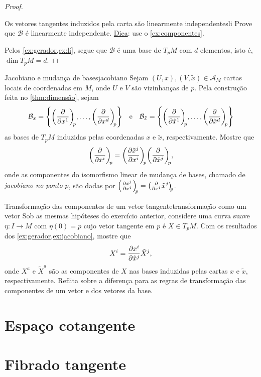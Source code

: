 \documentclass[12pt,a4paper]{article}
\numberwithin{equation}{section}
\DeclarePairedDelimiter\set{\{}{\}}
\newcommand\bvec[3][]{\ensuremath{\diffp*{#1}{#2}[#3]}}
\newcommand\bset[3]{\ensuremath{\set*{\diffp*{}{{#1}^1}[#3], \dots, \diffp*{}{{#1}^{#2}}[#3]}}}
\begin{document}
\begin{proof}
    \begin{exercício}{Os vetores tangentes induzidos pela carta são linearmente independentes}{li}
        Prove que \(\mathcal{B}\) é linearmente independente. \underline{Dica}: use o \cref{ex:componentes}.
    \end{exercício}

    Pelos \cref{ex:gerador,ex:li}, segue que \(\mathcal{B}\) é uma base de \(T_pM\) com \(d\) elementos, isto é, \(\dim{T_pM} = d\).
\end{proof}

\begin{exercício}{Jacobiano e mudança de bases}{jacobiano}
    Sejam \((U, x), (V, \tilde{x}) \in \mathscr{A}_M\) cartas locais de coordenadas em \(M\), onde \(U\) e \(V\) são vizinhanças de \(p\). Pela construção feita no \cref{thm:dimensão}, sejam
    \begin{equation*}
        \mathcal{B}_x=\bset{x}{d}{p}\quad\text{e}\quad\mathcal{B}_{\tilde{x}}=\bset{\tilde{x}}{d}{p}
    \end{equation*}
    as bases de \(T_pM\) induzidas pelas coordenadas \(x\) e \(\tilde{x}\), respectivamente. Mostre que
    \begin{equation*}
        \bvec{x^i}{p} = \diffp{\tilde{x}^j}{x^i}[p]\bvec{\tilde{x}^j}{p},
    \end{equation*}
    onde as componentes do isomorfismo linear de mudança de bases, chamado de \emph{jacobiano no ponto \(p\)}, são dadas por \(\diffp{\tilde{x}^j}{x^i}[p] = \bvec[\tilde{x}^j]{x^i}{p}\).
\end{exercício}

\begin{exercício}{Transformação das componentes de um vetor tangente}{transformação como um vetor}
    Sob as mesmas hipóteses do exercício anterior, considere uma curva suave \(\eta : I \to M\) com \(\eta(0) = p\) cujo vetor tangente em \(p\) é \(X \in T_pM\). Com os resultados dos \cref{ex:gerador,ex:jacobiano}, mostre que
    \begin{equation*}
        X^i = \diffp{x^i}{\tilde{x}^j} \tilde{X}^j,
    \end{equation*}
    onde \(X^a\) e \(\tilde{X}^a\) são as componentes de \(X\) nas bases induzidas pelas cartas \(x\) e \(\tilde{x}\), respectivamente. Reflita sobre a diferença para as regras de transformação das componentes de um vetor e dos vetores da base.
\end{exercício}

\section{Espaço cotangente}

\section{Fibrado tangente}
\end{document}
